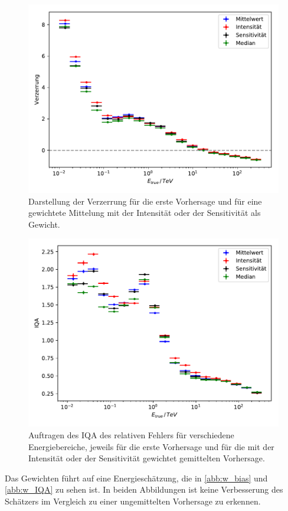 \begin{figure}
  \includegraphics[width=\textwidth]{Plots/RF_weights_bias.pdf}
  \centering
  \caption{Darstellung der Verzerrung für die erste Vorhersage und für eine gewichtete Mittelung mit der Intensität
            oder der Sensitivität als Gewicht.}
  \label{abb:w_bias}
\end{figure}
\begin{figure}
  \includegraphics[width=\textwidth]{Plots/RF_weights_resolution.pdf}
  \centering
  \caption{Auftragen des IQA des relativen Fehlers für verschiedene Energiebereiche, jeweils für die erste Vorhersage und
            für die mit der Intensität oder der Sensitivität gewichtet gemittelten Vorhersage.}
  \label{abb:w_IQA}
\end{figure}
Das Gewichten führt auf eine Energieschätzung, die in \autoref{abb:w_bias} und \autoref{abb:w_IQA} zu sehen ist.
In beiden Abbildungen ist keine Verbesserung des Schätzers im Vergleich zu einer ungemittelten Vorhersage zu erkennen.



